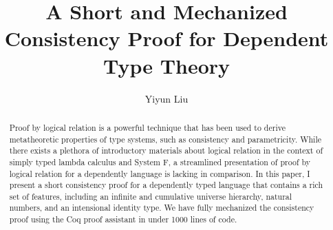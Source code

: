 \documentclass[nonacm]{acmart}
\begin{document}
\title{A Short and Mechanized Consistency Proof for Dependent Type Theory}

\author{Yiyun Liu}


\begin{abstract}
Proof by logical relation is a powerful technique that has been used
to derive metatheoretic properties of type systems, such as
consistency and parametricity. While there exists a
plethora of introductory materials about logical relation in the
context of simply typed lambda calculus and System F, a streamlined
presentation of proof by logical relation for a dependently language
is lacking in comparison. In this paper, I present a short
consistency proof for a dependently typed language that contains a
rich set of features, including an infinite and cumulative universe
hierarchy, natural numbers, and an intensional identity type. We have
fully mechanized the consistency proof using the Coq proof assistant
in under 1000 lines of code.
\end{abstract}


\maketitle
\end{document}
